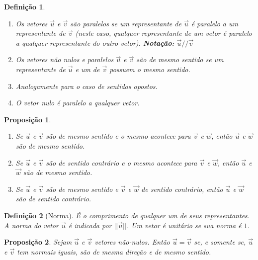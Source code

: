 \documentclass[oneside,a4paper,12pt]{article}
\newtheorem{proposition}{Proposição}[section]
\newtheorem{definition}{Definição}[section]
\begin{document}
\begin{definition}
	\begin{enumerate}
		\item Os vetores $\overrightarrow{u}$ e $\overrightarrow{v}$ são \emph{paralelos} se um representante de $\overrightarrow{u}$ é paralelo a um representante de $\overrightarrow{v}$ (neste caso, qualquer representante de um vetor é paralelo a qualquer representante do outro vetor). {\bf Notação:} $\overrightarrow{u} // \overrightarrow{v}$
		\item Os vetores não nulos e paralelos $\overrightarrow{u}$ e $\overrightarrow{v}$ são \emph{de mesmo sentido} se um representante de $\overrightarrow{u}$ e um de $\overrightarrow{v}$ possuem o mesmo sentido.
		\item Analogamente para o caso de \emph{sentidos opostos}.
		\item O vetor nulo é paralelo a qualquer vetor.
	\end{enumerate}
\end{definition}

\begin{proposition}
	\begin{enumerate}
		\item Se $\overrightarrow{u}$ e $\overrightarrow{v}$ são de mesmo sentido e o mesmo acontece para $\overrightarrow{v}$ e $\overrightarrow{w}$, então $\overrightarrow{u}$ e $\overrightarrow{w}$ são de mesmo sentido.
		\item Se $\overrightarrow{u}$ e $\overrightarrow{v}$ são de sentido contrário e o mesmo acontece para $\overrightarrow{v}$ e $\overrightarrow{w}$, então $\overrightarrow{u}$ e $\overrightarrow{w}$ são de mesmo sentido.
		\item Se $\overrightarrow{u}$ e $\overrightarrow{v}$ são de mesmo sentido e $\overrightarrow{v}$ e $\overrightarrow{w}$ de sentido contrário, então $\overrightarrow{u}$ e $\overrightarrow{w}$ são de sentido contrário.
	\end{enumerate}
\end{proposition}

\begin{definition}[Norma]
	É o comprimento de qualquer um de seus representantes. A norma do vetor $\overrightarrow{u}$ é indicada por $||\overrightarrow{u}||$. Um vetor é \emph{unitário} se sua norma é $1$.
\end{definition}

\begin{proposition}
	Sejam $\overrightarrow{u}$ e $\overrightarrow{v}$ vetores não-nulos. Então $\overrightarrow{u} = \overrightarrow{v}$ se, e somente se, $\overrightarrow{u}$ e $\overrightarrow{v}$ tem normais iguais, são de mesma direção e de mesmo sentido.
\end{proposition}
\end{document}
